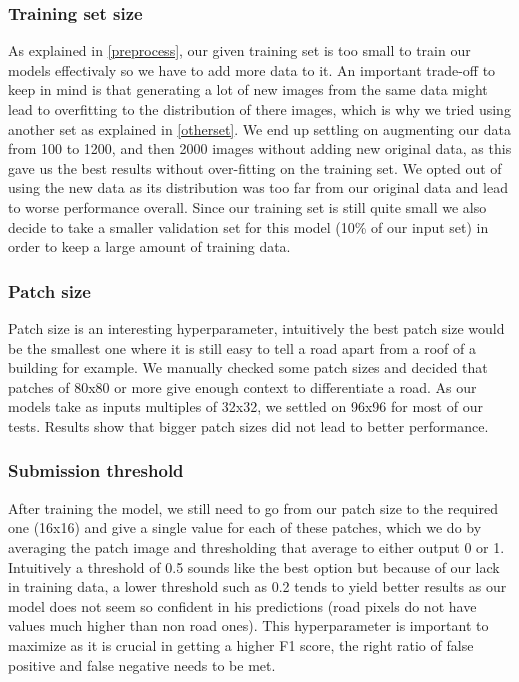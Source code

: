 \documentclass[10pt,conference,compsocconf]{IEEEtran}
\begin{document}
\subsubsection{Training set size}
As explained in \ref{preprocess}, our given training set is too small to train our models effectivaly so we have to add more data to it. An important trade-off to keep in mind is that generating a lot of new images from the same data might lead to overfitting to the distribution of there images, which is why we tried using another set as explained in \ref{otherset}. We end up settling on augmenting our data from 100 to 1200, and then 2000 images without adding new original data, as this gave us the best results without over-fitting on the training set. We opted out of using the new data as its distribution was too far from our original data and lead to worse performance overall.\newline
Since our training set is still quite small we also decide to take a smaller validation set for this model (10\% of our input set) in order to keep a large amount of training data.
\subsubsection{Patch size}
Patch size is an interesting hyperparameter, intuitively the best patch size would be the smallest one where it is still easy to tell a road apart from a roof of a building for example. We manually checked some patch sizes and decided that patches of 80x80 or more give enough context to differentiate a road. As our models take as inputs multiples of 32x32, we settled on 96x96 for most of our tests. Results show that bigger patch sizes did not lead to better performance.
\subsubsection{Submission threshold}
After training the model, we still need to go from our patch size to the required one (16x16) and give a single value for each of these patches, which we do by averaging the patch image and thresholding that average to either output 0 or 1. Intuitively a threshold of 0.5 sounds like the best option but because of our lack in training data, a lower threshold such as 0.2 tends to yield better results as our model does not seem so confident in his predictions (road pixels do not have values much higher than non road ones). This hyperparameter is important to maximize as it is crucial in getting a higher F1 score, the right ratio of false positive and false negative needs to be met.
\end{document}
